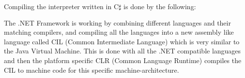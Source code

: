 Compiling the interpreter written in C$\sharp$ is done by the following:

The .NET Framework is working by combining different languages and their matching compilers, and compiling all the languages into a new assembly like language called CIL (Common Intermediate Language) \cite{CIL} which is very similar to the Java Virtual Machine. This is done with all the .NET compatible languages and then the platform specific CLR (Common Language Runtime) compiles the CIL to machine code for this specific machine-architecture.